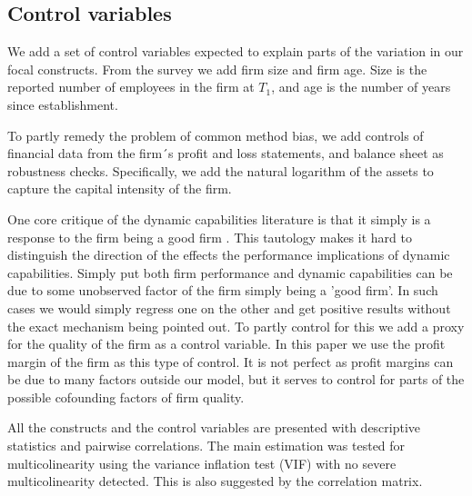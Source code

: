 \documentclass[review,fleqn]{elsarticle}\usepackage[]{graphicx}\usepackage[]{color}
\begin{document}
\subsection*{Control variables}

We add a set of control variables expected to explain parts of the variation in our focal
constructs. From the survey we add firm size and firm age. Size is the reported number of
employees in the firm at $T_1$, and age is the number of years since establishment.

To partly remedy the problem of common method bias, we add controls of financial data from
the firm´s profit and loss statements, and balance sheet as robustness
checks. Specifically, we add the natural logarithm of the assets to capture the capital
intensity of the firm.

One core critique of the dynamic capabilities literature is that it simply is a response
to the firm being a good firm \citep{Arend2009}. This tautology makes it hard to
distinguish the direction of the effects the performance implications of dynamic
capabilities. Simply put both firm performance and dynamic capabilities can be due to some
unobserved factor of the firm simply being a 'good firm'. In such cases we would simply
regress one on the other and get positive results without the exact mechanism being
pointed out. To partly control for this we add a proxy for the quality of the firm as a
control variable. In this paper we use the profit margin of the firm as this type of
control. It is not perfect as profit margins can be due to many factors outside our model,
but it serves to control for parts of the possible cofounding factors of firm quality.

All the constructs and the control variables are presented with descriptive statistics and
pairwise correlations. The main estimation was tested for multicolinearity using the
variance inflation test (VIF) with no severe multicolinearity detected. This is also
suggested by the correlation matrix.
\end{document}
